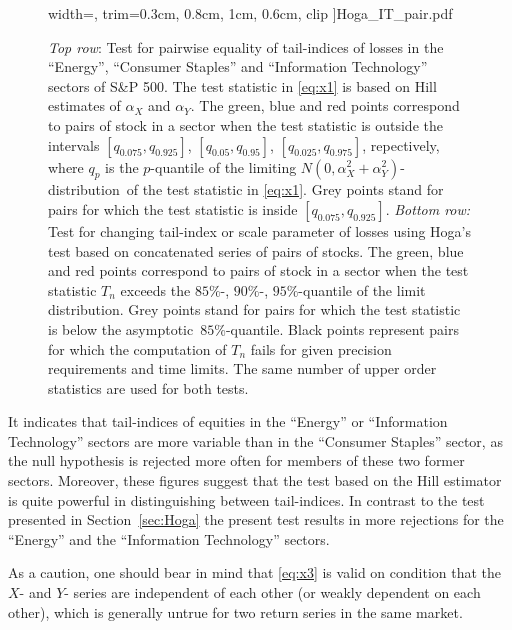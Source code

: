 \documentclass[11pt,a4]{amsart}
\newcommand{\asy}{asymptotic}
\newcommand{\ds}{distribution}
\newcommand{\1}{{\mathbf 1}}
\begin{document}
\begin{figure}[htb!]
\begin{minipage}{0.33\linewidth}
      width=\textwidth,
      trim={0.3cm, 0.8cm, 1cm, 0.6cm}, clip
    ]{Hoga_IT_pair.pdf}
  \end{minipage}
  \caption{{\em Top row}: Test for pairwise equality of tail-indices
    of losses in the  ``Energy'', ``Consumer Staples'' and
    ``Information Technology'' 
    sectors of S\&P 500. The test statistic in \eqref{eq:x1} is based
    on Hill estimates 
    of $\alpha_X$ and $\alpha_Y$. 
    The green, blue and red points correspond to pairs of stock in a sector
    when the test statistic is outside the intervals $[q_{0.075},q_{0.925}]$,
    $[q_{0.05},q_{0.95}]$,  $[q_{0.025},q_{0.975}]$, repectively, where
    $q_p$ is the $p$-quantile of the limiting 
    $N(0,\alpha_X^2+\alpha_Y^2)$-\ds\ of the test statistic in
    \eqref{eq:x1}. Grey points stand for pairs for which the test
    statistic is inside $[q_{0.075},q_{0.925}]$. 
    {\em Bottom row:} Test for changing tail-index or scale parameter
    of losses
    using Hoga's test based on concatenated series of pairs of
    stocks. The green, blue and red points
    correspond to pairs of stock in a sector 
    when the test statistic $T_n$ exceeds the $85\%$-, $90\%$-,
    $95\%$-quantile of the limit \ds .
  Grey points stand for pairs for which the test statistic is below
  the \asy\ $85\%$-quantile. Black points represent 
    pairs for which the computation of $T_n$ fails for given precision  
    requirements and time limits.
    The same number of upper order statistics are used for both tests.}
  \label{fig:PairTest} 
\end{figure}
It indicates that tail-indices of equities in the
``Energy'' or ``Information Technology'' sectors are more variable 
than in the ``Consumer Staples'' sector, as the null
hypothesis is rejected more often for members of these two former sectors.
Moreover, these figures suggest that the test based on the Hill estimator
is quite powerful in distinguishing between tail-indices. In contrast to the test presented in Section~\ref{sec:Hoga}
the present test results in  more rejections for the ``Energy'' and the
``Information Technology'' sectors.
\par
As a caution, one should bear in mind that 
\eqref{eq:x3} is valid on condition that the $X$- and $Y$-
series are independent of each other (or weakly dependent on each other), which is generally untrue for
two return series in the same market.
\end{document}
